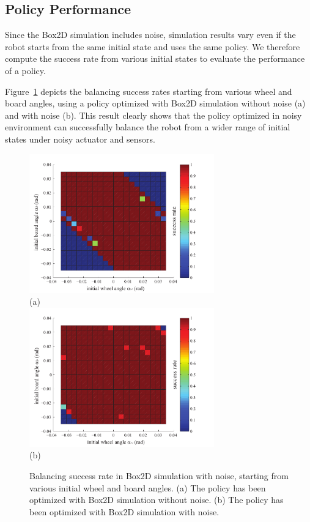 \documentclass[letterpaper, 10 pt, conference]{ieeeconf}
\begin{document}
\subsection{Policy Performance}

Since the Box2D simulation includes noise, simulation results vary 
even if the robot starts from the same initial state and uses the same
policy. 
We therefore compute the success rate from various initial states to
evaluate the performance of a policy.

Figure~\ref{fig:learning_success-rate} depicts the balancing success
rates starting from various wheel and board angles, using a policy
optimized with Box2D simulation without noise (a) and with noise (b).
This result clearly shows that the policy optimized in noisy environment
can successfully balance the robot from a wider range of initial states
under noisy actuator and sensors.

\begin{figure}[tb]
\begin{center}
\includegraphics[width=80mm]{eps/sim_clean2_0000128.pdf}\\
(a)\\
\includegraphics[width=80mm]{eps/sim_noise1_0000128.pdf}\\
(b)
\caption{Balancing success rate in Box2D simulation with noise, starting
 from various initial wheel and board angles.
(a) The policy has been optimized with Box2D simulation without noise.
(b) The policy has been optimized with Box2D simulation with noise.}
\label{fig:learning_success-rate}
\end{center}
\end{figure}
\end{document}
